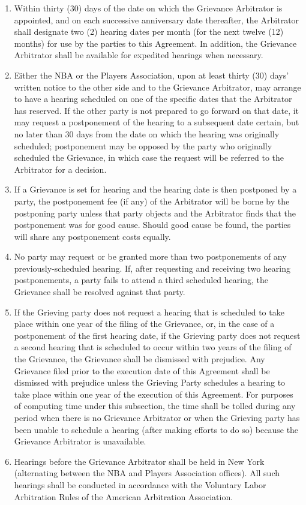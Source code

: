 \documentclass[
]{book}
\providecommand{\tightlist}{%
  \setlength{\itemsep}{0pt}\setlength{\parskip}{0pt}}
\begin{document}
\begin{enumerate}
\def\labelenumi{(\alph{enumi})}
\tightlist
\item
  Within thirty (30) days of the date on which the Grievance Arbitrator is appointed, and on each successive anniversary date thereafter, the Arbitrator shall designate two (2) hearing dates per month (for the next twelve (12) months) for use by the parties to this Agreement. In addition, the Grievance Arbitrator shall be available for expedited hearings when necessary.
\item
  Either the NBA or the Players Association, upon at least thirty (30) days' written notice to the other side and to the Grievance Arbitrator, may arrange to have a hearing scheduled on one of the specific dates that the Arbitrator has reserved. If the other party is not prepared to go forward on that date, it may request a postponement of the hearing to a subsequent date certain, but no later than 30 days from the date on which the hearing was originally scheduled; postponement may be opposed by the party who originally scheduled the Grievance, in which case the request will be referred to the Arbitrator for a decision.
\item
  If a Grievance is set for hearing and the hearing date is then postponed by a party, the postponement fee (if any) of the Arbitrator will be borne by the postponing party unless that party objects and the Arbitrator finds that the postponement was for good cause. Should good cause be found, the parties will share any postponement costs equally.
\item
  No party may request or be granted more than two postponements of any previously-scheduled hearing. If, after requesting and receiving two hearing postponements, a party fails to attend a third scheduled hearing, the Grievance shall be resolved against that party.
\item
  If the Grieving party does not request a hearing that is scheduled to take place within one year of the filing of the Grievance, or, in the case of a postponement of the first hearing date, if the Grieving party does not request a second hearing that is scheduled to occur within two years of the filing of the Grievance, the Grievance shall be dismissed with prejudice. Any Grievance filed prior to the execution date of this Agreement shall be dismissed with prejudice unless the Grieving Party schedules a hearing to take place within one year of the execution of this Agreement. For purposes of computing time under this subsection, the time shall be tolled during any period when there is no Grievance Arbitrator or when the Grieving party has been unable to schedule a hearing (after making efforts to do so) because the Grievance Arbitrator is unavailable.
\item
  Hearings before the Grievance Arbitrator shall be held in New York (alternating between the NBA and Players Association offices). All such hearings shall be conducted in accordance with the Voluntary Labor Arbitration Rules of the American Arbitration Association.
\end{enumerate}
\end{document}
